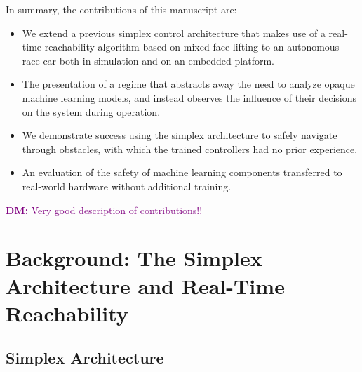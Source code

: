 \documentclass[manuscript,screen,review]{acmart}
\newcommand{\todo}[1]{\textcolor{red}{\textbf{\underline{TODO:}} #1}}
\newcommand{\diego}[1]{\textcolor{purple}{\textbf{\underline{DM:}} #1}}
\begin{document}
In summary, the contributions of this manuscript are: 
\begin{itemize}
    \item We extend a previous simplex control architecture that makes use of a real-time reachability algorithm based on mixed face-lifting to an autonomous race car both in simulation and on an embedded platform.
    \item The presentation of a regime that abstracts away the need to analyze opaque machine learning models, and instead observes the influence of their decisions on the system during operation.
    \item We demonstrate success using the simplex architecture to safely navigate through obstacles, with which the trained controllers had no prior experience.
    \item An evaluation of the safety of machine learning components transferred to real-world hardware without additional training.
\end{itemize}

\diego{Very good description of contributions!!}
\section{Background: The Simplex Architecture and Real-Time Reachability}

\subsection{Simplex Architecture}

\end{document}
